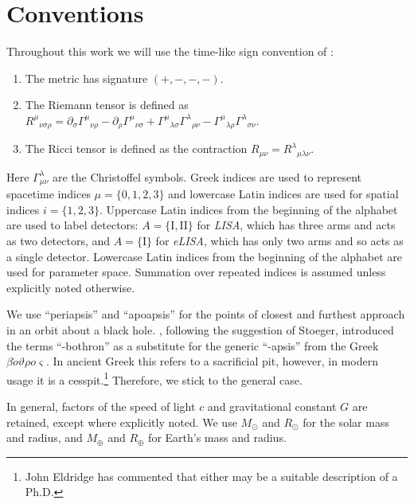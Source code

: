 \chapter{Conventions}
\label{conventions}

Throughout this work we will use the time-like sign convention of \citet{Landau1975}:
\begin{enumerate}
\item The metric has signature $(+,-,-,-)$.
\item The Riemann tensor is defined as ${R^\mu}_{\nu\sigma\rho} = \partial_\sigma {\Gamma^\mu}_{\nu\rho} - \partial_\rho {\Gamma^\mu}_{\nu\sigma} + {\Gamma^\mu}_{\lambda\sigma}{\Gamma^\lambda}_{\rho\nu} - {\Gamma^\mu}_{\lambda\rho}{\Gamma^\lambda}_{\sigma\nu}$.
\item The Ricci tensor is defined as the contraction $R_{\mu\nu} = {R^\lambda}_{\mu\lambda\nu}$.
\end{enumerate}
Here $\Gamma^\lambda_{\mu\nu}$ are the Christoffel symbols. Greek indices are used to represent spacetime indices $\mu = \{0,1,2,3\}$ %
and lowercase Latin indices are used for spatial indices $i = \{1,2,3\}$. Uppercase Latin indices from the beginning of the alphabet are used to label detectors: $A = \{\mathrm{I}, \mathrm{II}\}$ for \textit{LISA}, which has three arms and acts as two detectors, and $A = \{\mathrm{I}\}$ for \textit{eLISA}, which has only two arms and so acts as a single detector. Lowercase Latin indices from the beginning of the alphabet are used for parameter space. Summation over repeated indices is assumed unless explicitly noted otherwise.

We use ``periapsis'' and ``apoapsis'' for the points of closest and furthest approach in an orbit about a black hole. \citet{Frank1976}, following the suggestion of Stoeger, introduced the terms ``-bothron'' as a substitute for the generic ``-apsis'' from the Greek {$\mathit{\beta\acute{o}\vartheta\rho o \varsigma}$}. In ancient Greek this refers to a sacrificial pit, however, in modern usage it is a cesspit.\footnote{John Eldridge has commented that either may be a suitable description of a Ph.D.} Therefore, we stick to the general case.

In general, factors of the speed of light $c$ and gravitational constant $G$ are retained, except where explicitly noted. We use $M_\odot$ and $R_\odot$ for the solar mass and radius, and $M_\oplus$ and $R_\oplus$ for Earth's mass and radius.
